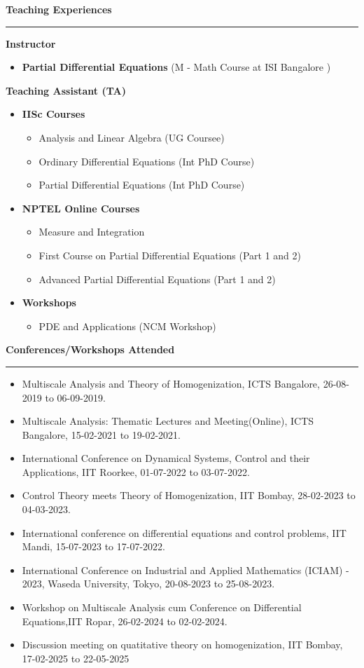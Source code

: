 \documentclass[a4paper,11pt]{letter}
\begin{document}
	\textbf{\large Teaching Experiences}\smallskip\hrule
	
	\textbf{Instructor}
	\begin{itemize}
		\item \textbf{Partial Differential Equations} (M - Math Course at ISI Bangalore )
	\end{itemize}
	
	\textbf{Teaching Assistant (TA)}
	\begin{itemize}
		\item \textbf{IISc Courses}
		\begin{itemize}
			\item Analysis and Linear Algebra (UG Coursee)
			\item Ordinary Differential Equations (Int PhD Course)
			\item Partial Differential Equations (Int PhD Course)
		\end{itemize}
		\item \textbf{NPTEL Online Courses}
		\begin{itemize}
			\item Measure and Integration
			\item First Course on Partial Differential Equations (Part 1 and 2)
			\item Advanced Partial Differential Equations (Part 1 and 2)
		\end{itemize}
		\item \textbf{Workshops}
		\begin{itemize}
			\item PDE and Applications (NCM Workshop)
		\end{itemize}
	\end{itemize}

	\textbf{\large Conferences/Workshops Attended}\smallskip\hrule

	\begin{itemize}
		\item Multiscale Analysis and Theory of Homogenization, ICTS Bangalore, 26-08-2019 to 06-09-2019.
		\item Multiscale Analysis: Thematic Lectures and Meeting(Online), ICTS Bangalore, 15-02-2021 to 19-02-2021.  
		\item International Conference on Dynamical Systems, Control and their Applications, IIT Roorkee, 01-07-2022 to 03-07-2022.
		\item Control Theory meets Theory of Homogenization, IIT Bombay, 28-02-2023 to 04-03-2023.
		\item International conference on differential equations and control problems, IIT Mandi, 15-07-2023 to 17-07-2022.
		\item International Conference on Industrial and Applied Mathematics (ICIAM) - 2023, Waseda University, Tokyo, 20-08-2023 to 25-08-2023.
		\item Workshop on Multiscale Analysis cum Conference on Differential Equations,IIT Ropar, 26-02-2024 to 02-02-2024.
		\item Discussion meeting on quatitative theory on homogenization, IIT Bombay, 17-02-2025 to 22-05-2025
	\end{itemize}
	
	
\end{document}
